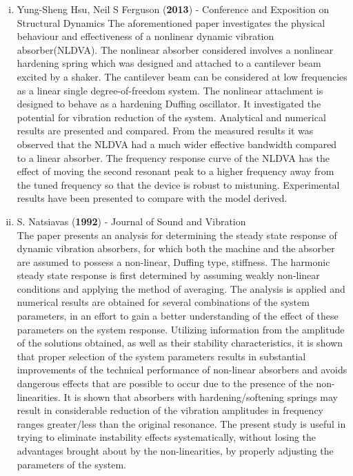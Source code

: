 \begin{enumerate}[i)]
\item {Yung-Sheng Hsu, Neil S Ferguson (\textbf{2013}) - Conference and Exposition on Structural Dynamics}
The aforementioned paper investigates the physical behaviour and effectiveness of a nonlinear dynamic vibration absorber(NLDVA). The nonlinear absorber considered involves a nonlinear hardening spring which was designed and attached to a cantilever beam excited by a shaker. The cantilever beam can be considered at low frequencies as a linear single degree-of-freedom system. The nonlinear attachment is designed to behave as a hardening Duffing oscillator.
It investigated the potential for vibration reduction of the system. Analytical and numerical results are presented and compared. From the measured results it was observed that the NLDVA had a much wider effective bandwidth compared to a linear absorber. The frequency response curve of the NLDVA has the effect of moving the second resonant peak to a higher frequency away from the tuned frequency so that the device is robust to mistuning.
Experimental results have been presented to compare with
the model derived.

\item {S. Natsiavas (\textbf{1992}) - Journal of Sound and Vibration}\\
The paper presents an analysis for determining the steady state response of dynamic vibration absorbers, for which both the machine and the absorber are assumed
to possess a non-linear, Duffing type, stiffness. The harmonic steady state
response is first determined by assuming weakly non-linear conditions and applying the
method of averaging.
The analysis is applied and numerical results are obtained for several combinations
of the system parameters, in an effort to gain a better understanding of the effect of
these parameters on the system response. Utilizing information from the amplitude of the
solutions obtained, as well as their stability characteristics, it is shown that proper selection
of the system parameters results in substantial improvements of the technical performance
of non-linear absorbers and avoids dangerous effects that are possible to occur due to the
presence of the non-linearities.
It is shown that absorbers with
hardening/softening springs may result in considerable reduction of the vibration amplitudes
in frequency ranges greater/less than the original resonance. The present study is useful in
trying to eliminate instability effects systematically, without losing the advantages brought
about by the non-linearities, by properly adjusting the parameters of the system.\\
\end{enumerate}
